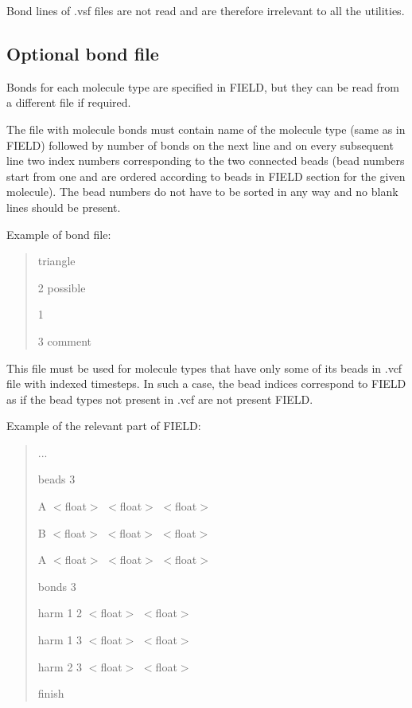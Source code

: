 Bond lines of {\ttfamily .vsf} files are not read and are therefore irrelevant to all the utilities.\hypertarget{InputFiles_BondFile}{}\subsection{Optional bond file }\label{InputFiles_BondFile}
Bonds for each molecule type are specified in {\ttfamily F\+I\+E\+LD}, but they can be read from a different file if required.

The file with molecule bonds must contain name of the molecule type (same as in {\ttfamily F\+I\+E\+LD}) followed by number of bonds on the next line and on every subsequent line two index numbers corresponding to the two connected beads (bead numbers start from one and are ordered according to beads in {\ttfamily F\+I\+E\+LD} section for the given molecule). The bead numbers do not have to be sorted in any way and no blank lines should be present.

Example of bond file\+:

\begin{quote}
{\ttfamily triangle}

{}

{ 2 possible}

{ 1}

{ 3 comment} \end{quote}


This file must be used for molecule types that have only some of its beads in {\ttfamily .vcf} file with indexed timesteps. In such a case, the bead indices correspond to {\ttfamily F\+I\+E\+LD} as if the bead types not present in {\ttfamily .vcf} are not present {\ttfamily F\+I\+E\+LD}.

Example of the relevant part of {\ttfamily F\+I\+E\+LD}\+:

\begin{quote}
{\ttfamily ...}

{\ttfamily beads 3}

{\ttfamily A $<$float$>$ $<$float$>$ $<$float$>$}

{\ttfamily B $<$float$>$ $<$float$>$ $<$float$>$}

{\ttfamily A $<$float$>$ $<$float$>$ $<$float$>$}

{\ttfamily bonds 3}

{\ttfamily harm 1 2 $<$float$>$ $<$float$>$}

{\ttfamily harm 1 3 $<$float$>$ $<$float$>$}

{\ttfamily harm 2 3 $<$float$>$ $<$float$>$}

{\ttfamily finish} \end{quote}


